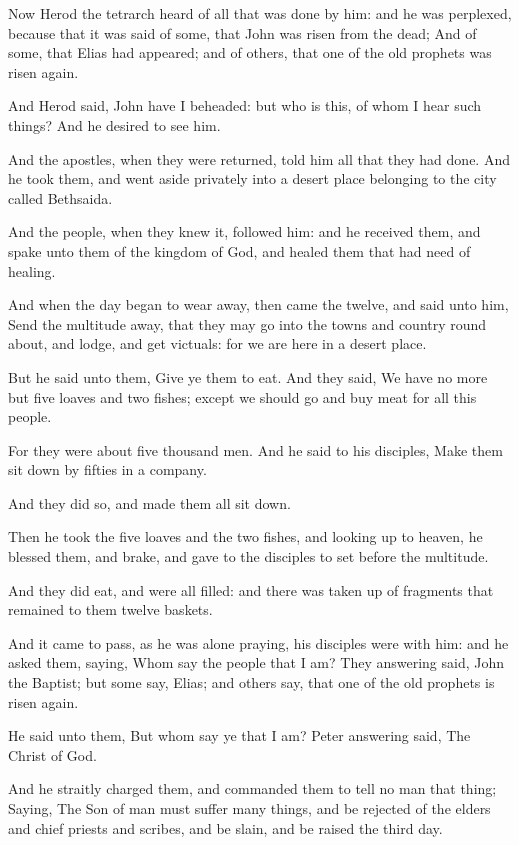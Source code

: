 \verse Now Herod the tetrarch heard of all that was done by him: and he was perplexed, because that it was said of some, that John was risen from the dead; \verse And of some, that Elias had appeared; and of others, that one of the old prophets was risen again.

\verse And Herod said, John have I beheaded: but who is this, of whom I hear such things? And he desired to see him.

\verse And the apostles, when they were returned, told him all that they had done. And he took them, and went aside privately into a desert place belonging to the city called Bethsaida.

\verse And the people, when they knew it, followed him: and he received them, and spake unto them of the kingdom of God, and healed them that had need of healing.

\verse And when the day began to wear away, then came the twelve, and said unto him, Send the multitude away, that they may go into the towns and country round about, and lodge, and get victuals: for we are here in a desert place.

\verse But he said unto them, Give ye them to eat. And they said, We have no more but five loaves and two fishes; except we should go and buy meat for all this people.

\verse For they were about five thousand men. And he said to his disciples, Make them sit down by fifties in a company.

\verse And they did so, and made them all sit down.

\verse Then he took the five loaves and the two fishes, and looking up to heaven, he blessed them, and brake, and gave to the disciples to set before the multitude.

\verse And they did eat, and were all filled: and there was taken up of fragments that remained to them twelve baskets.

\verse And it came to pass, as he was alone praying, his disciples were with him: and he asked them, saying, Whom say the people that I am?  \verse They answering said, John the Baptist; but some say, Elias; and others say, that one of the old prophets is risen again.

\verse He said unto them, But whom say ye that I am? Peter answering said, The Christ of God.

\verse And he straitly charged them, and commanded them to tell no man that thing; \verse Saying, The Son of man must suffer many things, and be rejected of the elders and chief priests and scribes, and be slain, and be raised the third day.

